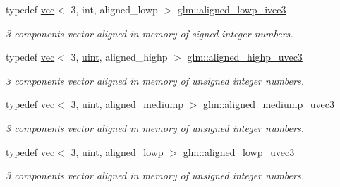 \begin{DoxyCompactItemize}
\mbox{\label{group__gtc__type__aligned_ga2862680efddc950ffe37245cb49dd960}} 
typedef \hyperlink{structglm_1_1vec}{vec}$<$ 3, int, aligned\+\_\+lowp $>$ \hyperlink{group__gtc__type__aligned_ga2862680efddc950ffe37245cb49dd960}{glm\+::aligned\+\_\+lowp\+\_\+ivec3}
\begin{DoxyCompactList}\small\item\em 3 components vector aligned in memory of signed integer numbers. \end{DoxyCompactList}\item 
\mbox{\label{group__gtc__type__aligned_ga1d303644825af6267389d6405f490ddc}} 
typedef \hyperlink{structglm_1_1vec}{vec}$<$ 3, \hyperlink{group__core__precision_ga4fd29415871152bfb5abd588334147c8}{uint}, aligned\+\_\+highp $>$ \hyperlink{group__gtc__type__aligned_ga1d303644825af6267389d6405f490ddc}{glm\+::aligned\+\_\+highp\+\_\+uvec3}
\begin{DoxyCompactList}\small\item\em 3 components vector aligned in memory of unsigned integer numbers. \end{DoxyCompactList}\item 
\mbox{\label{group__gtc__type__aligned_ga5d37a008051d20c6079933f0680b6521}} 
typedef \hyperlink{structglm_1_1vec}{vec}$<$ 3, \hyperlink{group__core__precision_ga4fd29415871152bfb5abd588334147c8}{uint}, aligned\+\_\+mediump $>$ \hyperlink{group__gtc__type__aligned_ga5d37a008051d20c6079933f0680b6521}{glm\+::aligned\+\_\+mediump\+\_\+uvec3}
\begin{DoxyCompactList}\small\item\em 3 components vector aligned in memory of unsigned integer numbers. \end{DoxyCompactList}\item 
\mbox{\label{group__gtc__type__aligned_gadaa291d4c8716193c6294d6e711eb071}} 
typedef \hyperlink{structglm_1_1vec}{vec}$<$ 3, \hyperlink{group__core__precision_ga4fd29415871152bfb5abd588334147c8}{uint}, aligned\+\_\+lowp $>$ \hyperlink{group__gtc__type__aligned_gadaa291d4c8716193c6294d6e711eb071}{glm\+::aligned\+\_\+lowp\+\_\+uvec3}
\begin{DoxyCompactList}\small\item\em 3 components vector aligned in memory of unsigned integer numbers. \end{DoxyCompactList}\item 

\end{DoxyCompactItemize}
